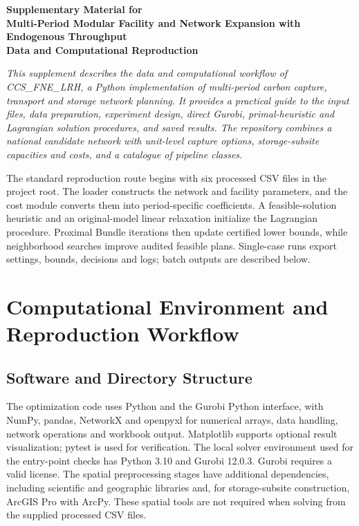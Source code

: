 \documentclass[11pt,letterpaper]{article}
\begin{document}
\begin{center}
  {\sffamily\bfseries\Large Supplementary Material for\\[3pt]
  Multi-Period Modular Facility and Network Expansion with Endogenous Throughput\\[3pt]
  Data and Computational Reproduction}
\end{center}
\vspace{7pt}

\noindent\textit{This supplement describes the data and computational workflow of CCS\_FNE\_LRH, a Python implementation of multi-period carbon capture, transport and storage network planning. It provides a practical guide to the input files, data preparation, experiment design, direct Gurobi, primal-heuristic and Lagrangian solution procedures, and saved results. The repository combines a national candidate network with unit-level capture options, storage-subsite capacities and costs, and a catalogue of pipeline classes.}

The standard reproduction route begins with six processed CSV files in the project root. The loader constructs the network and facility parameters, and the cost module converts them into period-specific coefficients. A feasible-solution heuristic and an original-model linear relaxation initialize the Lagrangian procedure. Proximal Bundle iterations then update certified lower bounds, while neighborhood searches improve audited feasible plans. Single-case runs export settings, bounds, decisions and logs; batch outputs are described below.

\section{Computational Environment and Reproduction Workflow}
\subsection{Software and Directory Structure}

The optimization code uses Python and the Gurobi Python interface, with NumPy, pandas, NetworkX and openpyxl for numerical arrays, data handling, network operations and workbook output. Matplotlib supports optional result visualization; pytest is used for verification. The local solver environment used for the entry-point checks has Python 3.10 and Gurobi 12.0.3. Gurobi requires a valid license. The spatial preprocessing stages have additional dependencies, including scientific and geographic libraries and, for storage-subsite construction, ArcGIS Pro with ArcPy. These spatial tools are not required when solving from the supplied processed CSV files.
\end{document}
